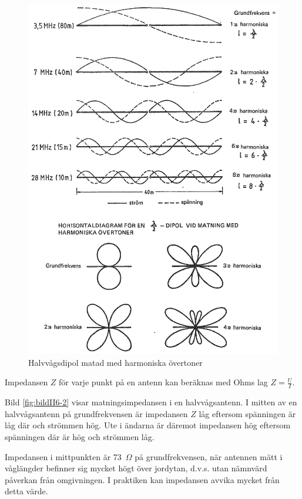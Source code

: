 \begin{figure}
  \includegraphics[width=\textwidth]{images/cropped_pdfs/bild_2_6-03.pdf}
  \caption{Halvvågsdipol matad med harmoniska övertoner}
  \label{fig:bildII6-3}
\end{figure}

Impedansen \(Z\) för varje punkt på en antenn kan beräknas med Ohms lag
\(Z = \frac{U}{I}\).

Bild \ref{fig:bildII6-2} visar matningsimpedansen i en halvvågsantenn.
I mitten av en halvvågsantenn på grundfrekvensen är impedansen \(Z\)
låg eftersom spänningen är låg där och strömmen hög.
Ute i ändarna är däremot impedansen hög eftersom spänningen där är hög och
strömmen låg.

Impedansen i mittpunkten är 73~\(\Omega\) på grundfrekvensen, när antennen mätt
i våglängder befinner sig mycket högt över jordytan, d.v.s. utan
nämnvärd påverkan från omgivningen.
I praktiken kan impedansen avvika mycket från detta värde.


